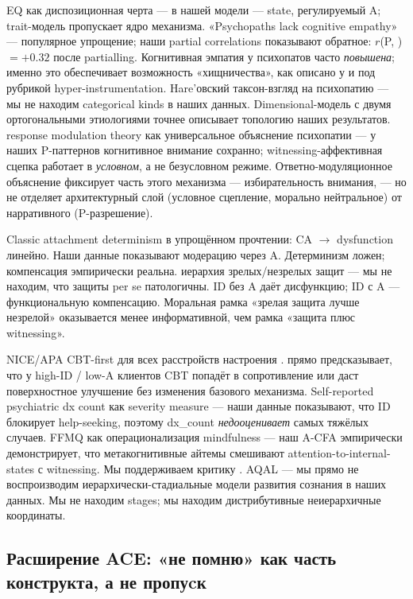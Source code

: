 \citet{baroncohen2011} EQ как диспозиционная черта --- в нашей модели \EAF{} --- state, регулируемый A; trait-модель пропускает ядро механизма. «Psychopaths lack cognitive empathy» --- популярное упрощение; наши partial correlations показывают обратное: $r$(P, \Ecog{}) $= +0.32$ после partialling. Когнитивная эмпатия у психопатов часто \emph{повышена}; именно это обеспечивает возможность «хищничества», как описано у \citet{blair2013} и \citet{baroncohen2011} под рубрикой hyper-instrumentation. Hare'овский таксон-взгляд на психопатию --- мы не находим categorical kinds в наших данных. Dimensional-модель с двумя ортогональными этиологиями точнее описывает топологию наших результатов. \citet{newman2003} response modulation theory как универсальное объяснение психопатии --- у наших P-паттернов когнитивное внимание сохранно; witnessing-аффективная сцепка работает в \emph{условном}, а не безусловном режиме. Ответно-модуляционное объяснение фиксирует часть этого механизма --- избирательность внимания, --- но не отделяет архитектурный слой (условное сцепление, морально нейтральное) от нарративного (P-разрешение).

Classic attachment determinism \citep{bowlby1969} в упрощённом прочтении: CA $\to$ dysfunction линейно. Наши данные показывают модерацию через A. Детерминизм ложен; компенсация эмпирически реальна. \citet{vaillant1977} иерархия зрелых/незрелых защит --- мы не находим, что защиты per se патологичны. ID без A даёт дисфункцию; ID с A --- функциональную компенсацию. Моральная рамка «зрелая защита лучше незрелой» оказывается менее информативной, чем рамка «защита плюс witnessing».

NICE/APA CBT-first для всех расстройств настроения \citep{nice2022, apa2019}. \DEIC{} прямо предсказывает, что у high-ID / low-A клиентов CBT попадёт в сопротивление или даст поверхностное улучшение без изменения базового механизма. Self-reported psychiatric dx count как severity measure --- наши данные показывают, что ID блокирует help-seeking, поэтому dx\_count \emph{недооценивает} самых тяжёлых случаев. FFMQ \citep{baer2006} как операционализация mindfulness --- наш A-CFA эмпирически демонстрирует, что метакогнитивные айтемы смешивают attention-to-internal-states с witnessing. Мы поддерживаем критику \citet{vandam2018}. \citet{wilber1995, wilber2000} AQAL --- мы прямо не воспроизводим иерархически-стадиальные модели развития сознания в наших данных. Мы не находим stages; мы находим дистрибутивные неиерархичные координаты.

\subsection{Расширение ACE: «не помню» как часть конструкта, а не пропуcк}
\label{subsec:ace_extension}

